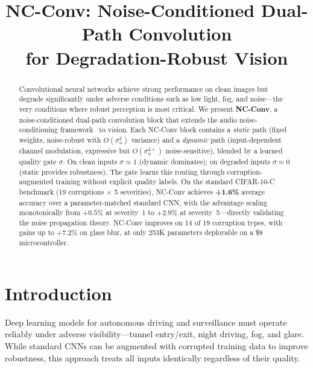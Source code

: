 \documentclass{bmvc2k}
\title{NC-Conv: Noise-Conditioned Dual-Path Convolution\\for Degradation-Robust Vision}
\begin{document}
\maketitle

\begin{abstract}
Convolutional neural networks achieve strong performance on clean images but degrade significantly under adverse conditions such as low light, fog, and noise---the very conditions where robust perception is most critical.
We present \textbf{NC-Conv}, a noise-conditioned dual-path convolution block that extends the audio noise-conditioning framework~\cite{choi2026ncssm} to vision.
Each NC-Conv block contains a \emph{static} path (fixed weights, noise-robust with $O(\sigma_n^2)$ variance) and a \emph{dynamic} path (input-dependent channel modulation, expressive but $O(\sigma_n^{4+})$ noise-sensitive), blended by a learned quality gate $\sigma$.
On clean inputs $\sigma \approx 1$ (dynamic dominates); on degraded inputs $\sigma \approx 0$ (static provides robustness).
The gate learns this routing through corruption-augmented training without explicit quality labels.
On the standard CIFAR-10-C benchmark (19 corruptions $\times$ 5 severities), NC-Conv achieves \textbf{+1.6\%} average accuracy over a parameter-matched standard CNN, with the advantage scaling monotonically from $+0.5\%$ at severity~1 to $+2.9\%$ at severity~5---directly validating the noise propagation theory.
NC-Conv improves on 14 of 19 corruption types, with gains up to $+7.2\%$ on glass blur, at only 253K parameters deployable on a \$8 microcontroller.
\end{abstract}

\section{Introduction}
\label{sec:intro}

Deep learning models for autonomous driving and surveillance must operate reliably under adverse visibility---tunnel entry/exit, night driving, fog, and glare.
While standard CNNs can be augmented with corrupted training data to improve robustness, this approach treats all inputs identically regardless of their quality.
\end{document}
